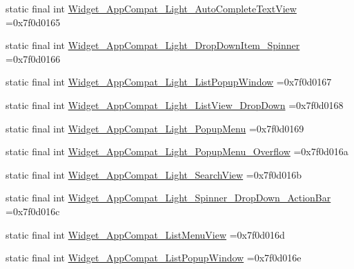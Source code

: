 \begin{DoxyCompactItemize}
\item 
static final int \mbox{\hyperlink{classbr_1_1unb_1_1cic_1_1mp_1_1marketmaster_1_1R_1_1style_a9957341900a9177d5d180d56229877c6}{Widget\+\_\+\+App\+Compat\+\_\+\+Light\+\_\+\+Auto\+Complete\+Text\+View}} =0x7f0d0165
\item 
static final int \mbox{\hyperlink{classbr_1_1unb_1_1cic_1_1mp_1_1marketmaster_1_1R_1_1style_aa733bc40bb098652881b4467c9a7301c}{Widget\+\_\+\+App\+Compat\+\_\+\+Light\+\_\+\+Drop\+Down\+Item\+\_\+\+Spinner}} =0x7f0d0166
\item 
static final int \mbox{\hyperlink{classbr_1_1unb_1_1cic_1_1mp_1_1marketmaster_1_1R_1_1style_a8595131e4a0d9db5763ef7e96dcf0ef6}{Widget\+\_\+\+App\+Compat\+\_\+\+Light\+\_\+\+List\+Popup\+Window}} =0x7f0d0167
\item 
static final int \mbox{\hyperlink{classbr_1_1unb_1_1cic_1_1mp_1_1marketmaster_1_1R_1_1style_ad3d4073a2cf05ec8e7ec37b0d98e920f}{Widget\+\_\+\+App\+Compat\+\_\+\+Light\+\_\+\+List\+View\+\_\+\+Drop\+Down}} =0x7f0d0168
\item 
static final int \mbox{\hyperlink{classbr_1_1unb_1_1cic_1_1mp_1_1marketmaster_1_1R_1_1style_a89dbbaa6493c8ac2da445bea40754ac6}{Widget\+\_\+\+App\+Compat\+\_\+\+Light\+\_\+\+Popup\+Menu}} =0x7f0d0169
\item 
static final int \mbox{\hyperlink{classbr_1_1unb_1_1cic_1_1mp_1_1marketmaster_1_1R_1_1style_ad817d15b9fe52f8fcfbfde27aa4c8943}{Widget\+\_\+\+App\+Compat\+\_\+\+Light\+\_\+\+Popup\+Menu\+\_\+\+Overflow}} =0x7f0d016a
\item 
static final int \mbox{\hyperlink{classbr_1_1unb_1_1cic_1_1mp_1_1marketmaster_1_1R_1_1style_afc4dc336710a8713ffc1e8bedb8c62f4}{Widget\+\_\+\+App\+Compat\+\_\+\+Light\+\_\+\+Search\+View}} =0x7f0d016b
\item 
static final int \mbox{\hyperlink{classbr_1_1unb_1_1cic_1_1mp_1_1marketmaster_1_1R_1_1style_a57d0d1b839e4db38955c7ce0c5b2c6c9}{Widget\+\_\+\+App\+Compat\+\_\+\+Light\+\_\+\+Spinner\+\_\+\+Drop\+Down\+\_\+\+Action\+Bar}} =0x7f0d016c
\item 
static final int \mbox{\hyperlink{classbr_1_1unb_1_1cic_1_1mp_1_1marketmaster_1_1R_1_1style_afac0ce7daafbc8f2854469fea943dd6e}{Widget\+\_\+\+App\+Compat\+\_\+\+List\+Menu\+View}} =0x7f0d016d
\item 
static final int \mbox{\hyperlink{classbr_1_1unb_1_1cic_1_1mp_1_1marketmaster_1_1R_1_1style_a33ec183ef3637772ed1dd92a12c0faf8}{Widget\+\_\+\+App\+Compat\+\_\+\+List\+Popup\+Window}} =0x7f0d016e
\item 

\end{DoxyCompactItemize}
